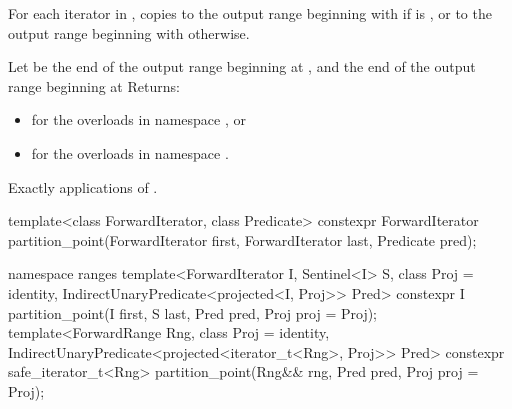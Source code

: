 \begin{itemdescr}
\pnum
\effects For each iterator  in , copies 
to the output range beginning with  if
  is , or
to the output range beginning with  otherwise.

\pnum
\returns
{}
\begin{addedblock}
Let  be the end of the output range beginning at ,
and  the end of the output range beginning at 
Returns:
\begin{itemize}
\item {} for the overloads in namespace , or
\item {} for the overloads in namespace .
\end{itemize}
\end{addedblock}

\pnum
\complexity Exactly  applications of 
.
\end{itemdescr}

%
\begin{itemdecl}
template<class ForwardIterator, class Predicate>
  constexpr ForwardIterator
    partition_point(ForwardIterator first, ForwardIterator last, Predicate pred);
\end{itemdecl}
\begin{addedblock}
\begin{itemdecl}
namespace ranges {
  template<ForwardIterator I, Sentinel<I> S, class Proj = identity,
      IndirectUnaryPredicate<projected<I, Proj>> Pred>
    constexpr I partition_point(I first, S last, Pred pred, Proj proj = Proj{});
  template<ForwardRange Rng, class Proj = identity,
      IndirectUnaryPredicate<projected<iterator_t<Rng>, Proj>> Pred>
    constexpr safe_iterator_t<Rng>
      partition_point(Rng&& rng, Pred pred, Proj proj = Proj{});
}
\end{itemdecl}
\end{addedblock}

